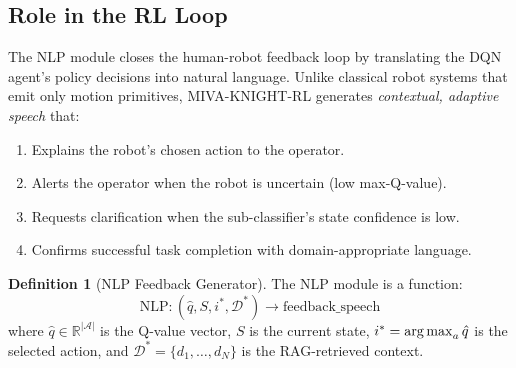 \documentclass[12pt,a4paper]{article}
\theoremstyle{definition}
\newtheorem{definition}{Definition}[section]
\theoremstyle{plain}
\theoremstyle{remark}
\newcommand{\R}{\mathbb{R}}
\newcommand{\argmax}{\operatornamewithlimits{arg\,max}}
\begin{document}
\subsection{Role in the RL Loop}

The NLP module closes the human-robot feedback loop by translating the DQN agent's policy decisions into natural language. Unlike classical robot systems that emit only motion primitives, MIVA-KNIGHT-RL generates \emph{contextual, adaptive speech} that:
\begin{enumerate}[nosep]
  \item Explains the robot's chosen action to the operator.
  \item Alerts the operator when the robot is uncertain (low max-Q-value).
  \item Requests clarification when the sub-classifier's state confidence is low.
  \item Confirms successful task completion with domain-appropriate language.
\end{enumerate}

\begin{definition}[NLP Feedback Generator]
The NLP module is a function:
\[
  \text{NLP} : (\hat{q}, S, i^*, \mathcal{D}^*) \to \text{feedback\_speech}
\]
where $\hat{q} \in \R^{|\mathcal{A}|}$ is the Q-value vector, $S$ is the current state, $i^* = \argmax_a \hat{q}$ is the selected action, and $\mathcal{D}^* = \{d_1,\ldots,d_N\}$ is the RAG-retrieved context.
\end{definition}
\end{document}

